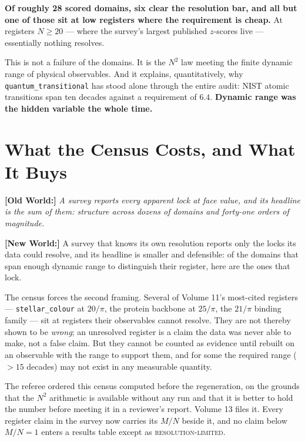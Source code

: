 \documentclass[11pt, letterpaper, openany]{book}
\newcommand{\oldworld}[1]{\noindent\textbf{\color{goldseal}[Old World:]} \textit{#1}\medskip}
\newcommand{\newworld}[1]{\noindent\textbf{\color{kishblue}[New World:]} #1\medskip}
\newcommand{\MN}{M/N}
\begin{document}
\begin{signalbox}
\textbf{Of roughly 28 scored domains, six clear the resolution bar, and all but one of those
sit at low registers where the requirement is cheap.} At registers $N \geq 20$ --- where the
survey's largest published $z$-scores live --- essentially nothing resolves.

\medskip
\noindent This is not a failure of the domains. It is the $N^2$ law meeting the finite dynamic
range of physical observables. And it explains, quantitatively, why
\texttt{quantum\_transitional} has stood alone through the entire audit: NIST atomic transitions
span ten decades against a requirement of $6.4$. \textbf{Dynamic range was the hidden variable
the whole time.}
\end{signalbox}

\section{What the Census Costs, and What It Buys}

\oldworld{A survey reports every apparent lock at face value, and its headline is the sum of
them: structure across dozens of domains and forty-one orders of magnitude.}

\newworld{A survey that knows its own resolution reports only the locks its data could resolve,
and its headline is smaller and defensible: of the domains that span enough dynamic range to
distinguish their register, here are the ones that lock.}

The census forces the second framing. Several of Volume 11's most-cited registers ---
\texttt{stellar\_colour} at $20/\pi$, the protein backbone at $25/\pi$, the $21/\pi$ binding
family --- sit at registers their observables cannot resolve. They are not thereby shown to be
\emph{wrong}; an unresolved register is a claim the data was never able to make, not a false
claim. But they cannot be counted as evidence until rebuilt on an observable with the range to
support them, and for some the required range ($>15$ decades) may not exist in any measurable
quantity.

\begin{rulingbox}
The referee ordered this census computed before the regeneration, on the grounds that the
$N^2$ arithmetic is available without any run and that it is better to hold the number before
meeting it in a reviewer's report. Volume 13 files it. Every register claim in the survey now
carries its $\MN$ beside it, and no claim below $\MN = 1$ enters a results table except as
\textsc{resolution-limited}.
\end{rulingbox}
\end{document}
